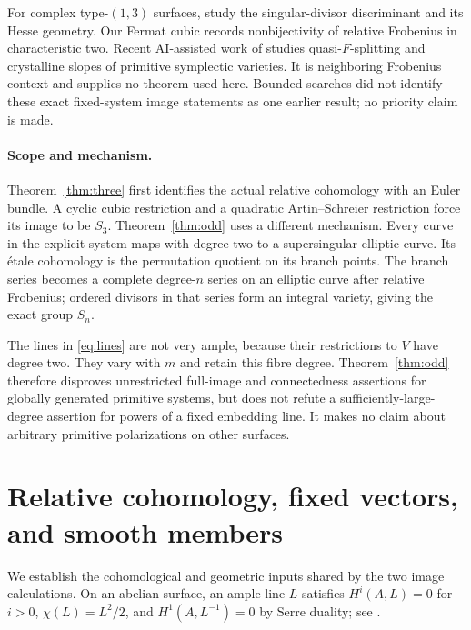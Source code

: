 \documentclass[11pt]{article}
\theoremstyle{remark}\newtheorem{remark}[theorem]{Remark}
\begin{document}
For complex type-$(1,3)$ surfaces, \citet[Introduction, Theorems~0.1--0.2, pp.~1--2]{CataneseSernesi} study the singular-divisor discriminant and its Hesse geometry. Our Fermat cubic records nonbijectivity of relative Frobenius in characteristic two. Recent AI-assisted work of \citet[Introduction, Theorems~A--C and declarations]{Zou} studies quasi-$F$-splitting and crystalline slopes of primitive symplectic varieties. It is neighboring Frobenius context and supplies no theorem used here. Bounded searches did not identify these exact fixed-system image statements as one earlier result; no priority claim is made.

\paragraph{Scope and mechanism.}
Theorem~\ref{thm:three} first identifies the actual relative cohomology with an Euler bundle. A cyclic cubic restriction and a quadratic Artin--Schreier restriction force its image to be $S_3$. Theorem~\ref{thm:odd} uses a different mechanism. Every curve in the explicit system maps with degree two to a supersingular elliptic curve. Its \'etale cohomology is the permutation quotient on its branch points. The branch series becomes a complete degree-$n$ series on an elliptic curve after relative Frobenius; ordered divisors in that series form an integral variety, giving the exact group $S_n$.

The lines in \eqref{eq:lines} are not very ample, because their restrictions to $V$ have degree two. They vary with $m$ and retain this fibre degree. Theorem~\ref{thm:odd} therefore disproves unrestricted full-image and connectedness assertions for globally generated primitive systems, but does not refute a sufficiently-large-degree assertion for powers of a fixed embedding line. It makes no claim about arbitrary primitive polarizations on other surfaces.

\section{Relative cohomology, fixed vectors, and smooth members}\label{sec:basic}

We establish the cohomological and geometric inputs shared by the two image calculations. On an abelian surface, an ample line $L$ satisfies $H^i(A,L)=0$ for $i>0$, $\chi(L)=L^2/2$, and $H^1(A,L^{-1})=0$ by Serre duality; see \citet[Theorems~9.11 and 9.14, with their proofs, pp.~131--133]{EGM}.
\end{document}
